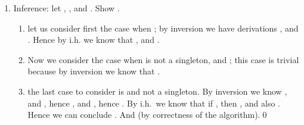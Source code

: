\documentclass{LMCS}
\begin{document}
{\begin{enumerate}[(1)]
\begin{enumerate}[]
\begin{enumerate}[(a)]
       \item , and
         . From those derivations we have by
         i.h.\ , and
         , respectively; from which 
         we conclude 
       \item , with
         , and ,
         hence by i.h. we know . We can
         also derive , hence
         .
       \end{enumerate}
     \item 
       \begin{enumerate}[(a)]
       \item , and
         ; from this we can conclude
          by ind. hyp. we get
         ; therefore
         .
       \item Or ,
         , and ,
         hence by i.h. we know
         , by conversion we also have
         and transitivity of the equality
         , hence
         .
       \end{enumerate}
     \item : then we do case analysis on .
       \begin{enumerate}[(a)]
       \item If , then by soundness of
         , and conversion we have
         ; and by inversion of
         singletons we have , and also
         . Clearly ,
         hence we can apply the inductive hypothesis and conclude
         ; from that and , we conclude 
         , i.e.,
         .
       \item If , then . We use the last clause for concluding
         ; but we need to show that if
         , then
         ; we show this in
         the next point.
         \end{enumerate}
     \end{enumerate}
   \item Inference: let ,
     , and . Show
     .
     \begin{enumerate}[]
     \item let us consider first the case when ; by
       inversion we have derivations , and
       .  Hence by i.h. we know that
       , and
       .
     \item Now we consider the case when  is not a singleton, and
       ; this case is trivial because by inversion
       we know that
       .
     \item the last case to consider is  and 
       not a singleton. By inversion we know
       , and
       , hence
       , and
       , hence .  By
       i.h.\ we know that if , then
       , and also
       . Hence we can conclude
       . And
        (by correctness of the
        algorithm).\qed
     \end{enumerate}
   \end{enumerate}
}

 
\end{document}
